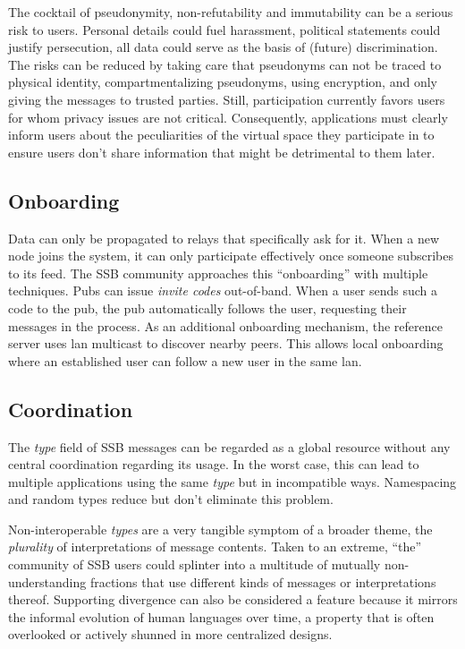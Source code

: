 \documentclass[10pt,sigconf,rewiew]{acmart}
\begin{document}
The cocktail of pseudonymity, non-refutability and immutability can be a serious risk to users. Personal details could fuel harassment, political statements could justify persecution, all data could serve as the basis of (future) discrimination. The risks can be reduced by taking care that pseudonyms can not be traced to physical identity, compartmentalizing pseudonyms, using encryption, and only giving the messages to trusted parties. Still, participation currently favors users for whom privacy issues are not critical. Consequently, applications must clearly inform users about the peculiarities of the virtual space they participate in to ensure users don't share information that might be detrimental to them later.

\subsection{Onboarding}

Data can only be propagated to relays that specifically ask for it. When a new node joins the system, it can only participate effectively once someone subscribes to its feed. The SSB community approaches this ``onboarding'' with multiple techniques. Pubs can issue \textit{invite codes} out-of-band. When a user sends such a code to the pub, the pub automatically follows the user, requesting their messages in the process. As an additional onboarding mechanism, the reference server uses lan multicast to discover nearby peers. This allows local onboarding where an established user can follow a new user in the same lan.

\subsection{Coordination}

The \textit{type} field of SSB messages can be regarded as a global resource without any central coordination regarding its usage. In the worst case, this can lead to multiple applications using the same \textit{type} but in incompatible ways. Namespacing and random types reduce but don't eliminate this problem.

Non-interoperable \textit{types} are a very tangible symptom of a broader theme, the \textit{plurality} of interpretations of message contents. Taken to an extreme, ``the'' community of SSB users could splinter into a multitude of mutually non-understanding fractions that use different kinds of messages or interpretations thereof. Supporting divergence can also be considered a feature because it mirrors the informal evolution of human languages over time, a property that is often overlooked or actively shunned in more centralized designs.
\end{document}

